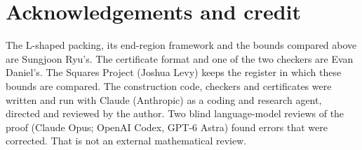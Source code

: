 \documentclass[11pt,letterpaper]{amsart}
\theoremstyle{plain}
\theoremstyle{remark}
\begin{document}
\section*{Acknowledgements and credit}

The L-shaped packing, its end-region framework and the bounds compared above are Sungjoon Ryu's. The certificate format and one of the two checkers are Evan Daniel's. The Squares Project (Joshua Levy) keeps the register in which these bounds are compared. The construction code, checkers and certificates were written and run with Claude (Anthropic) as a coding and research agent, directed and reviewed by the author. Two blind language-model reviews of the proof (Claude Opus; OpenAI Codex, GPT-6 Astra) found errors that were corrected. That is not an external mathematical review.
\end{document}

